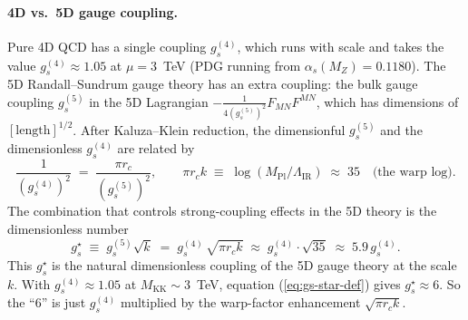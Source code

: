 \documentclass[11pt]{article}
\newcommand{\Mkk}{M_{\mathrm{KK}}}
\newcommand{\LamIR}{\Lambda_{\mathrm{IR}}}
\newcommand{\Mpl}{M_{\mathrm{Pl}}}
\newcommand{\gs}{g_s^{\star}}
\newcommand{\gsfour}{g_s^{(4)}}
\newcommand{\gsfive}{g_s^{(5)}}
\begin{document}
\paragraph{4D vs.\ 5D gauge coupling.}
Pure 4D QCD has a single coupling $\gsfour$, which runs with scale and
takes the value $\gsfour\!\approx\! 1.05$ at $\mu = 3$~TeV (PDG running
from $\alpha_s(M_Z) = 0.1180$). The 5D Randall--Sundrum gauge theory has
an extra coupling: the bulk gauge coupling $\gsfive$ in the 5D Lagrangian
$-\tfrac{1}{4(\gsfive)^2}F_{MN}F^{MN}$, which has dimensions of
$[\mathrm{length}]^{1/2}$. After Kaluza--Klein reduction, the dimensionful
$\gsfive$ and the dimensionless $\gsfour$ are related by
\begin{equation}
  \frac{1}{(\gsfour)^2} \;=\; \frac{\pi r_c}{(\gsfive)^2},
  \qquad
  \pi r_c k \;\equiv\; \log(\Mpl/\LamIR) \;\approx\; 35
  \quad\text{(the warp log).}
  \label{eq:5dto4d}
\end{equation}
The combination that controls strong-coupling effects in the 5D theory is
the dimensionless number
\begin{equation}
  \gs \;\equiv\; \gsfive \sqrt{k}
       \;=\; \gsfour\,\sqrt{\pi r_c k}
       \;\approx\; \gsfour \cdot \sqrt{35}
       \;\approx\; 5.9\,\gsfour.
  \label{eq:gs-star-def}
\end{equation}
This $\gs$ is the natural dimensionless coupling of the 5D gauge theory at
the scale $k$. With $\gsfour \approx 1.05$ at $\Mkk\!\sim\!3$~TeV, equation
(\ref{eq:gs-star-def}) gives $\gs\!\approx\!6$. So the ``6'' is just
$\gsfour$ multiplied by the warp-factor enhancement $\sqrt{\pi r_c k}$.
\end{document}
